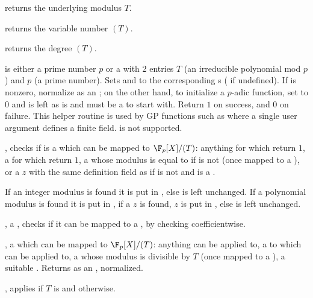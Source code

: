  returns the underlying modulus $T$.

 returns the variable number $(T)$.

 returns the degree $(T)$.


  is either
a prime number $p$ or a  with 2 entries $T$ (an irreducible
polynomial mod $p$) and $p$ (a prime number). Sets  and 
to the corresponding s ( if undefined). If 
is nonzero, normalize  as an ; on the other hand,
to initialize a $p$-adic function, set  to $0$ and  is left
as is and must be a  to start with. Return $1$ on success, and $0$ on
failure. This helper routine is used by GP functions such as 
where a single user argument defines a finite field.  is not
supported.

, checks if  is a 
which can be mapped to $\F_p[X]/(T)$: anything for which  return
$1$, a  for which  return $1$, a 
whose modulus is equal to  if  is not  (once mapped
to a ), or a  $z$ with the same definition field as 
if  is not  and is a .

If an integer modulus is found it is put in , else  is left
unchanged. If a polynomial modulus is found it is put in ,
if a  $z$ is found, $z$ is put in , else
 is left unchanged.

,  a ,
checks if it can be mapped to a , by checking 
coefficientwise.

,  a  which can be
mapped to $\F_p[X]/(T)$: anything  can be applied to,
a  to which  can be applied to, a 
whose modulus is divisible by $T$ (once mapped to a ), a suitable
. Returns  as an , normalized.

, applies  if $T$
is  and  otherwise.

